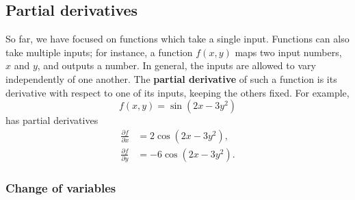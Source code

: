 \documentclass[10pt,a4paper]{article}
\begin{document}
\subsection{Partial derivatives}
\label{partial-derivatives}

So far, we have focused on functions which take a single input.
Functions can also take multiple inputs; for instance, a function
$f(x,y)$ maps two input numbers, $x$ and $y$, and outputs a number. In
general, the inputs are allowed to vary independently of one
another. The \textbf{partial derivative} of such a function is its
derivative with respect to one of its inputs, keeping the others
fixed.  For example,
\begin{equation}
f(x,y) = \sin(2x - 3 y^2)
\end{equation}
has partial derivatives
\begin{align}
  \frac{\partial f}{\partial x} &= 2\cos(2x-3y^2), \\
  \frac{\partial f}{\partial y} &= - 6\cos(2x-3y^2).
\end{align}

\subsubsection{Change of variables}
\label{change-of-variables}
\end{document}
